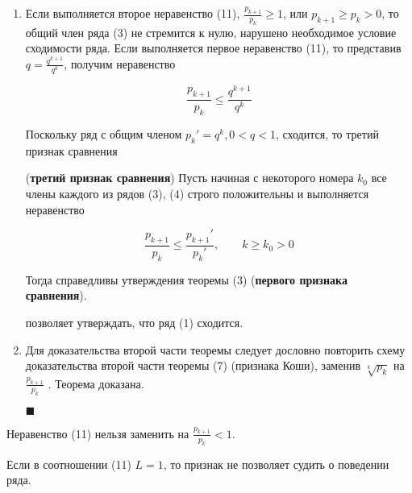 \begin{enumerate}
	\item Если выполняется второе неравенство (11), $\frac{p_{k + 1}}{p_k} \geqslant 1$, или $p_{k + 1} \geqslant p_k > 0$, то общий член ряда (3) не стремится к нулю, нарушено необходимое условие сходимости ряда. Если выполняется первое неравенство (11), то представив $q = \frac{q^{k + 1}}{q^k}$, получим неравенство
	
	\begin{equation*}
		\frac{p_{k + 1}}{p_k} \leqslant \frac{q^{k + 1}}{q^k}
	\end{equation*}
	
	Поскольку ряд с общим членом $p_k' = q^k, 0 < q < 1$, сходится, то третий признак сравнения
	
	\setcounter{theorem}{5}
	\begin{theorem}
		(\textbf{третий признак сравнения}) Пусть начиная с некоторого номера $k_0$ все члены каждого из рядов (3), (4) строго положительны и выполняется неравенство
		
		\begin{equation}
			\frac{p_{k + 1}}{p_k} \leqslant \frac{p_{k+1}'}{p_k'}, \qquad k \geqslant k_0 > 0
		\end{equation}
		
		Тогда справедливы утверждения теоремы (3) (\textbf{первого признака сравнения}).
	\end{theorem}
	\setcounter{theorem}{8}
	
	позволяет утверждать, что ряд (1) сходится.
	
	\item Для доказательства второй части теоремы следует дословно повторить схему доказательства второй части теоремы (7) (признака Коши), заменив $\sqrt[k]{p_k}$ на {\small $\frac{p_{k + 1}}{p_k}$ }. Теорема доказана. 
	
	\begin{flushright}
		$\blacksquare$
	\end{flushright}
\end{enumerate}

\setcounter{note}{0}

\begin{note}
	Неравенство (11) нельзя заменить на  $\frac{p_{k + 1}}{p_k} < 1$.
\end{note}

\begin{note}
	Если в соотношении (11) $L = 1$, то признак не позволяет судить о поведении ряда.
\end{note}

